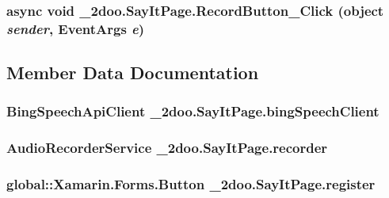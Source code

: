 \hypertarget{class__2doo_1_1_say_it_page_f20040dfacd2199bc111fbe551d8a16c}{
\subsubsection[{RecordButton\_\-Click}]{\setlength{\rightskip}{0pt plus 5cm}async void \_\-2doo.SayItPage.RecordButton\_\-Click (object {\em sender}, \/  EventArgs {\em e})}}
\label{class__2doo_1_1_say_it_page_f20040dfacd2199bc111fbe551d8a16c}




\subsection{Member Data Documentation}
\hypertarget{class__2doo_1_1_say_it_page_d27794b09e8155ed858b66e65813cef6}{
\subsubsection[{bingSpeechClient}]{\setlength{\rightskip}{0pt plus 5cm}BingSpeechApiClient {\bf \_\-2doo.SayItPage.bingSpeechClient}}}
\label{class__2doo_1_1_say_it_page_d27794b09e8155ed858b66e65813cef6}


\hypertarget{class__2doo_1_1_say_it_page_9c5c1aef7e6e03f8a858ec7d8704b324}{
\subsubsection[{recorder}]{\setlength{\rightskip}{0pt plus 5cm}AudioRecorderService {\bf \_\-2doo.SayItPage.recorder}}}
\label{class__2doo_1_1_say_it_page_9c5c1aef7e6e03f8a858ec7d8704b324}


\hypertarget{class__2doo_1_1_say_it_page_4c3c18cdc322167802ac0336dafa158c}{
\subsubsection[{register}]{\setlength{\rightskip}{0pt plus 5cm}global::Xamarin.Forms.Button {\bf \_\-2doo.SayItPage.register}}}
\label{class__2doo_1_1_say_it_page_4c3c18cdc322167802ac0336dafa158c}


